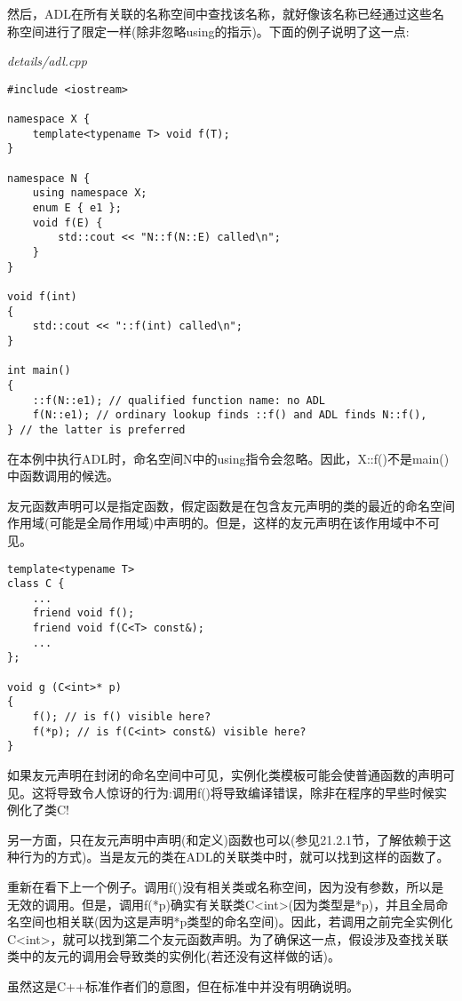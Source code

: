 然后，ADL在所有关联的名称空间中查找该名称，就好像该名称已经通过这些名称空间进行了限定一样(除非忽略using的指示)。下面的例子说明了这一点:

\noindent
\textit{details/adl.cpp}
\begin{lstlisting}[style=styleCXX]
#include <iostream>

namespace X {
	template<typename T> void f(T);
}

namespace N {
	using namespace X;
	enum E { e1 };
	void f(E) {
		std::cout << "N::f(N::E) called\n";
	}
}

void f(int)
{
	std::cout << "::f(int) called\n";
}

int main()
{
	::f(N::e1); // qualified function name: no ADL
	f(N::e1); // ordinary lookup finds ::f() and ADL finds N::f(),
} // the latter is preferred
\end{lstlisting}

在本例中执行ADL时，命名空间N中的using指令会忽略。因此，X::f()不是main()中函数调用的候选。


友元函数声明可以是指定函数，假定函数是在包含友元声明的类的最近的命名空间作用域(可能是全局作用域)中声明的。但是，这样的友元声明在该作用域中不可见。

\begin{lstlisting}[style=styleCXX]
template<typename T>
class C {
	...
	friend void f();
	friend void f(C<T> const&);
	...
};

void g (C<int>* p)
{
	f(); // is f() visible here?
	f(*p); // is f(C<int> const&) visible here?
}
\end{lstlisting}

如果友元声明在封闭的命名空间中可见，实例化类模板可能会使普通函数的声明可见。这将导致令人惊讶的行为:调用f()将导致编译错误，除非在程序的早些时候实例化了类C!

另一方面，只在友元声明中声明(和定义)函数也可以(参见21.2.1节，了解依赖于这种行为的方式)。当是友元的类在ADL的关联类中时，就可以找到这样的函数了。

重新在看下上一个例子。调用f()没有相关类或名称空间，因为没有参数，所以是无效的调用。但是，调用f(*p)确实有关联类C<int>(因为类型是*p)，并且全局命名空间也相关联(因为这是声明*p类型的命名空间)。因此，若调用之前完全实例化C<int>，就可以找到第二个友元函数声明。为了确保这一点，假设涉及查找关联类中的友元的调用会导致类的实例化(若还没有这样做的话)。

\begin{tcolorbox}[colback=webgreen!5!white,colframe=webgreen!75!black]
\hspace*{0.75cm}虽然这是C++标准作者们的意图，但在标准中并没有明确说明。
\end{tcolorbox}

